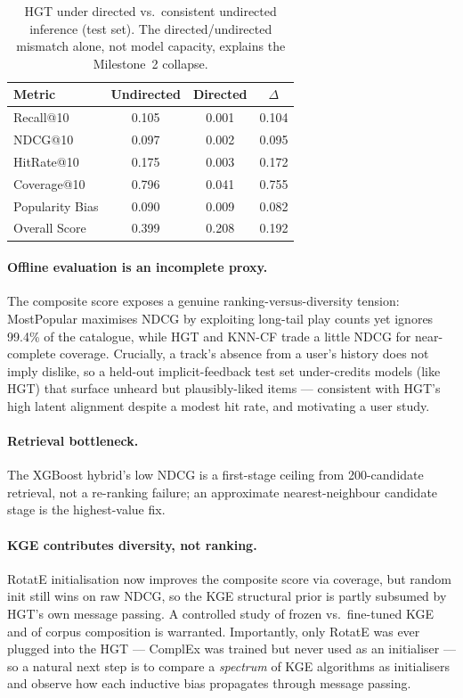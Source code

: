 \documentclass[10pt,twocolumn,letterpaper]{article}
\begin{document}
\begin{table}[t]
\centering\footnotesize
\caption{HGT under directed vs.\ consistent undirected inference (test set). The
directed/undirected mismatch alone, not model capacity, explains the Milestone~2
collapse.}
\label{tab:dirfix}
\setlength{\tabcolsep}{5pt}
\renewcommand{\arraystretch}{1.1}
\begin{tabular}{lccc}
\toprule
\textbf{Metric} & \textbf{Undirected} & \textbf{Directed} & \textbf{$\Delta$}\\
\midrule
Recall@10        & 0.105 & 0.001 & 0.104\\
NDCG@10          & 0.097 & 0.002 & 0.095\\
HitRate@10       & 0.175 & 0.003 & 0.172\\
Coverage@10      & 0.796 & 0.041 & 0.755\\
Popularity Bias  & 0.090 & 0.009 & 0.082\\
Overall Score    & 0.399 & 0.208 & 0.192\\
\bottomrule
\end{tabular}
\end{table}

\paragraph{Offline evaluation is an incomplete proxy.} The composite score exposes
a genuine ranking-versus-diversity tension: MostPopular maximises NDCG by exploiting
long-tail play counts yet ignores 99.4\% of the catalogue, while HGT and KNN-CF
trade a little NDCG for near-complete coverage. Crucially, a track's absence from a
user's history does not imply dislike, so a held-out implicit-feedback test set
under-credits models (like HGT) that surface unheard but plausibly-liked items ---
consistent with HGT's high latent alignment despite a modest hit rate, and
motivating a user study.

\paragraph{Retrieval bottleneck.} The XGBoost hybrid's low NDCG is a first-stage
ceiling from 200-candidate retrieval, not a re-ranking failure; an approximate
nearest-neighbour candidate stage is the highest-value fix.

\paragraph{KGE contributes diversity, not ranking.} RotatE initialisation now
improves the composite score via coverage, but random init still wins on raw NDCG,
so the KGE structural prior is partly subsumed by HGT's own message passing. A
controlled study of frozen vs.\ fine-tuned KGE and of corpus composition is
warranted. Importantly, only RotatE was ever plugged into the HGT --- ComplEx was
trained but never used as an initialiser --- so a natural next step is to compare a
\emph{spectrum} of KGE algorithms as initialisers and observe how each inductive
bias propagates through message passing.
\end{document}
